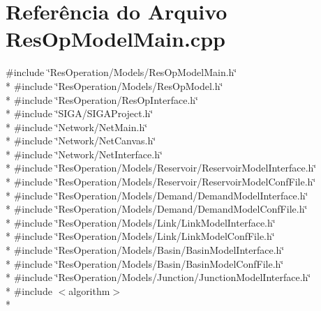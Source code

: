 \section{Referência do Arquivo Res\+Op\+Model\+Main.\+cpp}
\label{_res_op_model_main_8cpp}
{\ttfamily \#include \char`\"{}Res\+Operation/\+Models/\+Res\+Op\+Model\+Main.\+h\char`\"{}}\\*
{\ttfamily \#include \char`\"{}Res\+Operation/\+Models/\+Res\+Op\+Model.\+h\char`\"{}}\\*
{\ttfamily \#include \char`\"{}Res\+Operation/\+Res\+Op\+Interface.\+h\char`\"{}}\\*
{\ttfamily \#include \char`\"{}S\+I\+G\+A/\+S\+I\+G\+A\+Project.\+h\char`\"{}}\\*
{\ttfamily \#include \char`\"{}Network/\+Net\+Main.\+h\char`\"{}}\\*
{\ttfamily \#include \char`\"{}Network/\+Net\+Canvas.\+h\char`\"{}}\\*
{\ttfamily \#include \char`\"{}Network/\+Net\+Interface.\+h\char`\"{}}\\*
{\ttfamily \#include \char`\"{}Res\+Operation/\+Models/\+Reservoir/\+Reservoir\+Model\+Interface.\+h\char`\"{}}\\*
{\ttfamily \#include \char`\"{}Res\+Operation/\+Models/\+Reservoir/\+Reservoir\+Model\+Conf\+File.\+h\char`\"{}}\\*
{\ttfamily \#include \char`\"{}Res\+Operation/\+Models/\+Demand/\+Demand\+Model\+Interface.\+h\char`\"{}}\\*
{\ttfamily \#include \char`\"{}Res\+Operation/\+Models/\+Demand/\+Demand\+Model\+Conf\+File.\+h\char`\"{}}\\*
{\ttfamily \#include \char`\"{}Res\+Operation/\+Models/\+Link/\+Link\+Model\+Interface.\+h\char`\"{}}\\*
{\ttfamily \#include \char`\"{}Res\+Operation/\+Models/\+Link/\+Link\+Model\+Conf\+File.\+h\char`\"{}}\\*
{\ttfamily \#include \char`\"{}Res\+Operation/\+Models/\+Basin/\+Basin\+Model\+Interface.\+h\char`\"{}}\\*
{\ttfamily \#include \char`\"{}Res\+Operation/\+Models/\+Basin/\+Basin\+Model\+Conf\+File.\+h\char`\"{}}\\*
{\ttfamily \#include \char`\"{}Res\+Operation/\+Models/\+Junction/\+Junction\+Model\+Interface.\+h\char`\"{}}\\*
{\ttfamily \#include $<$algorithm$>$}\\*
